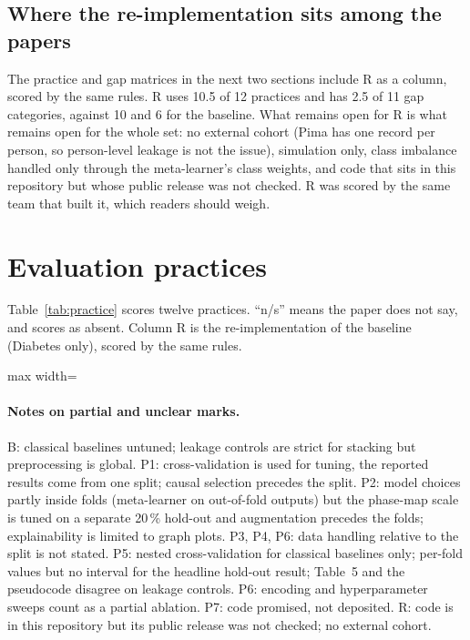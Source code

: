 \documentclass[11pt,a4paper]{article}
\newcommand{\tabdir}{../reimplementation/tex/papers/}
\begin{document}
\subsection{Where the re-implementation sits among the papers}
The practice and gap matrices in the next two sections include R as a column, scored by the same rules. R uses 10.5 of 12 practices and has 2.5 of 11 gap categories, against 10 and 6 for the baseline. What remains open for R is what remains open for the whole set: no external cohort (Pima has one record per person, so person-level leakage is not the issue), simulation only, class imbalance handled only through the meta-learner's class weights, and code that sits in this repository but whose public release was not checked. R was scored by the same team that built it, which readers should weigh.

\section{Evaluation practices}
\label{sec:practice}
Table~\ref{tab:practice} scores twelve practices. ``n/s'' means the paper does not say, and scores as absent. Column R is the re-implementation of the baseline (Diabetes only), scored by the same rules.

\begin{table}[H]
\centering\footnotesize
\caption{Evaluation practices (yes = 1, part = 0.5).}
\label{tab:practice}
\begin{adjustbox}{max width=\textwidth}

\end{adjustbox}
\end{table}

\paragraph{Notes on partial and unclear marks.} B: classical baselines untuned; leakage controls are strict for stacking but preprocessing is global. P1: cross-validation is used for tuning, the reported results come from one split; causal selection precedes the split. P2: model choices partly inside folds (meta-learner on out-of-fold outputs) but the phase-map scale is tuned on a separate 20\,\% hold-out and augmentation precedes the folds; explainability is limited to graph plots. P3, P4, P6: data handling relative to the split is not stated. P5: nested cross-validation for classical baselines only; per-fold values but no interval for the headline hold-out result; Table~5 and the pseudocode disagree on leakage controls. P6: encoding and hyperparameter sweeps count as a partial ablation. P7: code promised, not deposited. R: code is in this repository but its public release was not checked; no external cohort.
\end{document}
